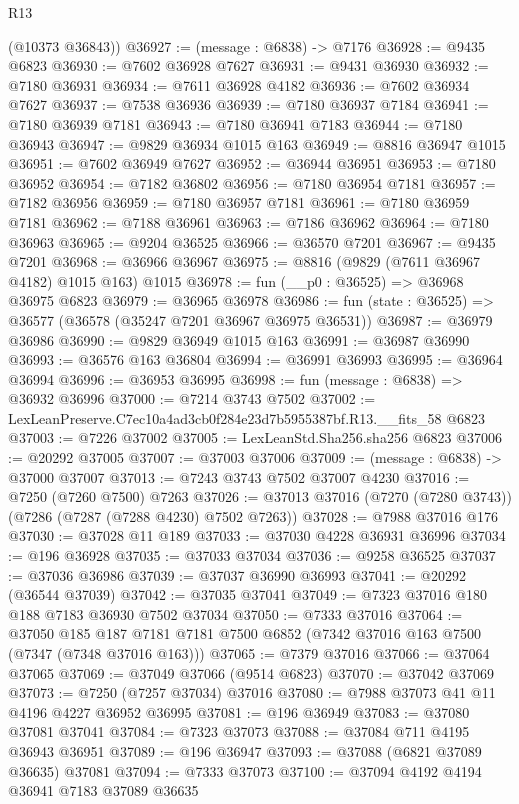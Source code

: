\begin{lexlean}{R13}
\begin{coremodule}
      (@10373 @36843))
@36927 := (message : @6838) -> @7176
@36928 := @9435 @6823
@36930 := @7602 @36928 @7627
@36931 := @9431 @36930
@36932 := @7180 @36931
@36934 := @7611 @36928 @4182
@36936 := @7602 @36934 @7627
@36937 := @7538 @36936
@36939 := @7180 @36937 @7184
@36941 := @7180 @36939 @7181
@36943 := @7180 @36941 @7183
@36944 := @7180 @36943
@36947 := @9829 @36934 @1015 @163
@36949 := @8816 @36947 @1015
@36951 := @7602 @36949 @7627
@36952 := @36944 @36951
@36953 := @7180 @36952
@36954 := @7182 @36802
@36956 := @7180 @36954 @7181
@36957 := @7182 @36956
@36959 := @7180 @36957 @7181
@36961 := @7180 @36959 @7181
@36962 := @7188 @36961
@36963 := @7186 @36962
@36964 := @7180 @36963
@36965 := @9204 @36525
@36966 := @36570 @7201
@36967 := @9435 @7201
@36968 := @36966 @36967
@36975 := @8816 (@9829 (@7611 @36967 @4182) @1015 @163) @1015
@36978 := fun (__p0 : @36525) => @36968 @36975 @6823
@36979 := @36965 @36978
@36986 := fun (state : @36525) => @36577 (@36578 (@35247 @7201 @36967 @36975 @36531))
@36987 := @36979 @36986
@36990 := @9829 @36949 @1015 @163
@36991 := @36987 @36990
@36993 := @36576 @163 @36804
@36994 := @36991 @36993
@36995 := @36964 @36994
@36996 := @36953 @36995
@36998 := fun (message : @6838) => @36932 @36996
@37000 := @7214 @3743 @7502
@37002 := LexLeanPreserve.C7ec10a4ad3cb0f284e23d7b5955387bf.R13.__fits_58 @6823
@37003 := @7226 @37002
@37005 := LexLeanStd.Sha256.sha256 @6823
@37006 := @20292 @37005
@37007 := @37003 @37006
@37009 := (message : @6838) -> @37000 @37007
@37013 := @7243 @3743 @7502 @37007 @4230
@37016 := @7250 (@7260 @7500) @7263
@37026 := @37013 @37016 (@7270 (@7280 @3743)) (@7286 (@7287 (@7288 @4230) @7502 @7263))
@37028 := @7988 @37016 @176
@37030 := @37028 @11 @189
@37033 := @37030 @4228 @36931 @36996
@37034 := @196 @36928
@37035 := @37033 @37034
@37036 := @9258 @36525
@37037 := @37036 @36986
@37039 := @37037 @36990 @36993
@37041 := @20292 (@36544 @37039)
@37042 := @37035 @37041
@37049 := @7323 @37016 @180 @188 @7183 @36930 @7502 @37034
@37050 := @7333 @37016
@37064 := @37050
    @185
    @187
    @7181
    @7181
    @7500
    @6852
    (@7342 @37016 @163 @7500 (@7347 (@7348 @37016 @163)))
@37065 := @7379 @37016
@37066 := @37064 @37065
@37069 := @37049 @37066 (@9514 @6823)
@37070 := @37042 @37069
@37073 := @7250 (@7257 @37034) @37016
@37080 := @7988 @37073 @41 @11 @4196 @4227 @36952 @36995
@37081 := @196 @36949
@37083 := @37080 @37081 @37041
@37084 := @7323 @37073
@37088 := @37084 @711 @4195 @36943 @36951
@37089 := @196 @36947
@37093 := @37088 (@6821 @37089 @36635) @37081
@37094 := @7333 @37073
@37100 := @37094 @4192 @4194 @36941 @7183 @37089 @36635

\end{coremodule}
\end{lexlean}
